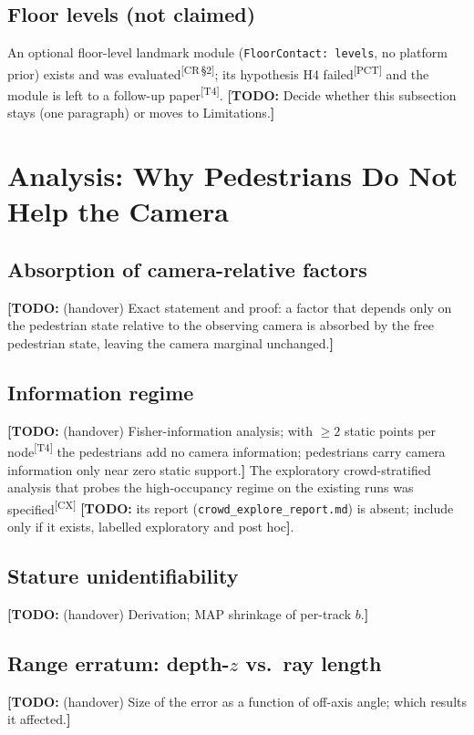 \documentclass[journal]{IEEEtran}
\newcommand{\TODO}[1]{{\color{red}\textbf{[TODO:} #1\textbf{]}}}
\newcommand{\src}[1]{\textsuperscript{\color{blue}\scriptsize[#1]}}
\begin{document}
\subsection{Floor levels (not claimed)}
An optional floor-level landmark module (\texttt{FloorContact: levels}, no
platform prior) exists and was evaluated\src{CR\,\S2}; its hypothesis H4
failed\src{PCT} and the module is left to a follow-up paper\src{T4}.
\TODO{Decide whether this subsection stays (one paragraph) or moves to
Limitations.}

\section{Analysis: Why Pedestrians Do Not Help the Camera}
\label{sec:analysis}

\subsection{Absorption of camera-relative factors}
\label{sec:an-absorb}
\TODO{(handover) Exact statement and proof: a factor that depends only on the
pedestrian state relative to the observing camera is absorbed by the free
pedestrian state, leaving the camera marginal unchanged.}

\subsection{Information regime}
\label{sec:an-info}
\TODO{(handover) Fisher-information analysis; with $\geq 2$ static points per
node\src{T4} the pedestrians add no camera information; pedestrians carry
camera information only near zero static support.} The exploratory
crowd-stratified analysis that probes the high-occupancy regime on the
existing runs was specified\src{CX} \TODO{its report
(\texttt{crowd\_explore\_report.md}) is absent; include only if it exists, labelled
exploratory and post hoc}.

\subsection{Stature unidentifiability}
\label{sec:an-stature}
\TODO{(handover) Derivation; MAP shrinkage of per-track $b$.}

\subsection{Range erratum: depth-$z$ vs.\ ray length}
\label{sec:an-range}
\TODO{(handover) Size of the error as a function of off-axis angle; which
results it affected.}
\end{document}
